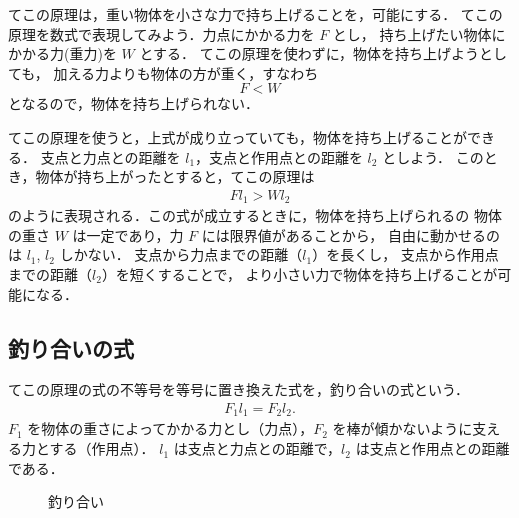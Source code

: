             てこの原理は，重い物体を小さな力で持ち上げることを，可能にする．
            てこの原理を数式で表現してみよう．力点にかかる力を $F$ とし，
            持ち上げたい物体にかかる力(重力)を $W$ とする．
            てこの原理を使わずに，物体を持ち上げようとしても，
            加える力よりも物体の方が重く，すなわち
                \begin{equation*}
                    F < W
                \end{equation*}
            となるので，物体を持ち上げられない．

            てこの原理を使うと，上式が成り立っていても，物体を持ち上げることができる．
            支点と力点との距離を $l_{1}$，支点と作用点との距離を $l_{2}$ としよう．
            このとき，物体が持ち上がったとすると，てこの原理は
                \begin{align}
                    Fl_{1} > Wl_{2}
                \end{align}
            のように表現される．この式が成立するときに，物体を持ち上げられるの
            物体の重さ $W$ は一定であり，力 $F$ には限界値があることから，
            自由に動かせるのは ${l}_{1}$, ${l}_{2}$ しかない．
            支点から力点までの距離（${l}_{1}$）を長くし，
            支点から作用点までの距離（${l}_{2}$）を短くすることで，
            より小さい力で物体を持ち上げることが可能になる．

        \subsection{釣り合いの式}
            てこの原理の式の不等号を等号に置き換えた式を，釣り合いの式という．
                \begin{align}
                    {F}_{1}{l}_{1} = {F}_{2}{l}_{2}.
                \end{align}
            ${F}_{1}$ を物体の重さによってかかる力とし（力点），${F}_{2}$ を棒が傾かないように支える力とする（作用点）．
            ${l}_{1}$ は支点と力点との距離で，${l}_{2}$ は支点と作用点との距離である．
                    \begin{figure}[hbt]
                        \begin{center}
                            \caption{釣り合い}
                            \label{fig:TekonoGenri111}
                        \end{center}
                    \end{figure}

